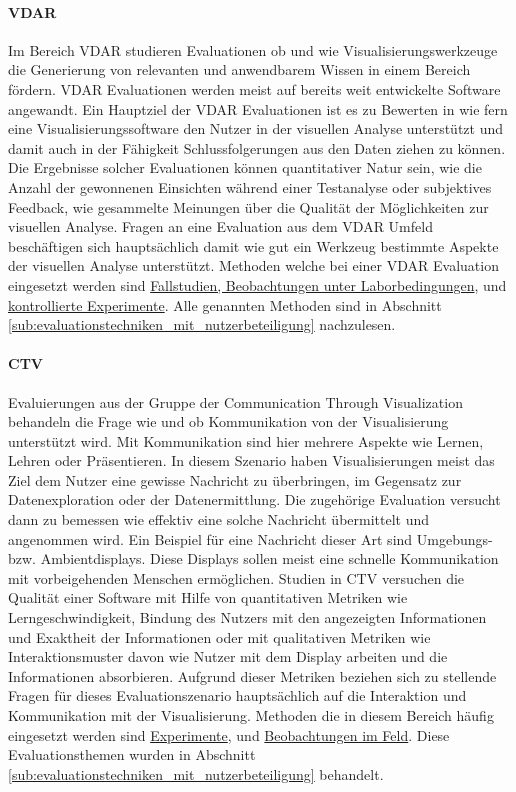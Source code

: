\documentclass[draft=false
              ,paper=a4
              ,twoside=false
              ,fontsize=11pt
              ,headsepline
              ,BCOR10mm
              ,DIV11
              ]{scrbook}
\begin{document}
\paragraph{VDAR} %
\label{par:vdar}
Im Bereich VDAR studieren Evaluationen ob und wie Visualisierungswerkzeuge die Generierung von relevanten und anwendbarem Wissen in einem Bereich fördern. VDAR Evaluationen werden meist auf bereits weit entwickelte Software angewandt. Ein Hauptziel der VDAR Evaluationen ist es zu Bewerten in wie fern eine Visualisierungssoftware den Nutzer in der visuellen Analyse unterstützt und damit auch in der Fähigkeit Schlussfolgerungen aus den Daten ziehen zu können. Die Ergebnisse solcher Evaluationen können quantitativer Natur sein, wie die Anzahl der gewonnenen Einsichten während einer Testanalyse oder subjektives Feedback, wie gesammelte Meinungen über die Qualität der Möglichkeiten zur visuellen Analyse. Fragen an eine Evaluation aus dem VDAR Umfeld beschäftigen sich hauptsächlich damit wie gut ein Werkzeug bestimmte Aspekte der visuellen Analyse unterstützt. Methoden welche bei einer VDAR Evaluation eingesetzt werden sind \hyperref[ssub:techniken_auf_grundlage_von_beobachtungen]{Fallstudien, Beobachtungen unter Laborbedingungen},  und \hyperref[ssub:empirische_techniken_auf_grundlage_von_experimenten]{kontrollierte Experimente}. Alle genannten Methoden sind in Abschnitt \ref{sub:evaluationstechniken_mit_nutzerbeteiligung} nachzulesen.

\paragraph{CTV} %
\label{par:ctv}
Evaluierungen aus der Gruppe der Communication Through Visualization behandeln die Frage wie und ob Kommunikation von der Visualisierung unterstützt wird. Mit Kommunikation sind hier mehrere Aspekte wie Lernen, Lehren oder Präsentieren. In diesem Szenario haben Visualisierungen meist das Ziel dem Nutzer eine gewisse Nachricht zu überbringen, im Gegensatz zur Datenexploration oder der Datenermittlung. Die zugehörige Evaluation versucht dann zu bemessen wie effektiv eine solche Nachricht übermittelt und angenommen wird. Ein Beispiel für eine Nachricht dieser Art sind Umgebungs- bzw. Ambientdisplays. Diese Displays sollen meist eine schnelle Kommunikation mit vorbeigehenden Menschen ermöglichen. Studien in CTV versuchen die Qualität einer Software mit Hilfe von quantitativen Metriken wie Lerngeschwindigkeit, Bindung des Nutzers mit den angezeigten Informationen und Exaktheit der Informationen oder mit qualitativen Metriken wie Interaktionsmuster davon wie Nutzer mit dem Display arbeiten und die Informationen absorbieren. Aufgrund dieser Metriken beziehen sich zu stellende Fragen für dieses Evaluationszenario hauptsächlich auf die Interaktion und Kommunikation mit der Visualisierung. Methoden die in diesem Bereich häufig eingesetzt werden sind \hyperref[ssub:empirische_techniken_auf_grundlage_von_experimenten]{Experimente},  und \hyperref[sub:evaluationstechniken_mit_nutzerbeteiligung]{Beobachtungen im Feld}. Diese Evaluationsthemen wurden in Abschnitt \ref{sub:evaluationstechniken_mit_nutzerbeteiligung} behandelt.
\end{document}
